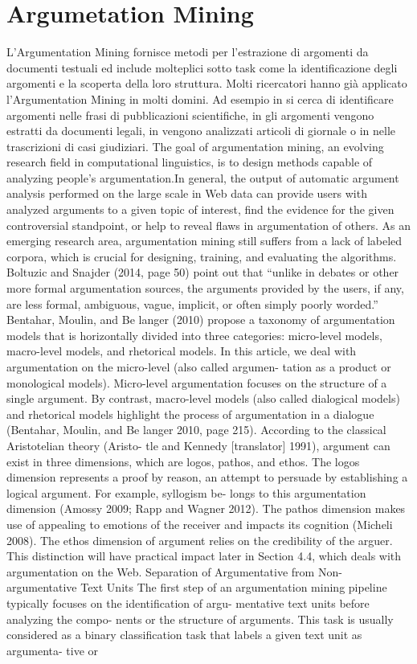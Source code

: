 \section{Argumetation Mining}
L'Argumentation Mining fornisce metodi per l'estrazione di argomenti da documenti testuali ed include molteplici sotto task come la identificazione degli argomenti e la scoperta della loro struttura. Molti ricercatori hanno già applicato l'Argumentation Mining in molti domini. Ad esempio in \cite{teufel1999annotation} si cerca di identificare argomenti nelle frasi di pubblicazioni scientifiche, in \cite{moens2007automatic} gli argomenti vengono estratti da documenti legali, in \cite{feng2011classifying} vengono analizzati articoli di giornale o in \cite{florou2013argument} nelle trascrizioni di casi giudiziari. The goal of argumentation mining, an evolving research field in computational linguistics, is to design methods capable of analyzing people’s argumentation.In general, the output of automatic argument analysis performed on the large scale in Web data can provide users with analyzed arguments to a given topic of interest, find the evidence for the given controversial standpoint, or help to reveal flaws in argumentation of others. As an emerging research area, argumentation mining still suffers from a lack of labeled corpora, which is crucial for designing, training, and evaluating the algorithms. Boltuzic  and Snajder (2014, page 50) point out that “unlike in debates or other more formal argumentation sources, the arguments provided by the users, if any, are less formal, ambiguous, vague, implicit, or often simply poorly worded.” Bentahar, Moulin, and Be langer (2010) propose a taxonomy of argumentation models that is horizontally divided into three categories: micro-level models, macro-level models, and rhetorical models. In this article, we deal with argumentation on the micro-level (also called argumen- tation as a product or monological models). Micro-level argumentation focuses on the structure of a single argument. By contrast, macro-level models (also called dialogical models) and rhetorical models highlight the process of argumentation in a dialogue (Bentahar, Moulin, and Be langer 2010, page 215). According to the classical Aristotelian theory (Aristo- tle and Kennedy [translator] 1991), argument can exist in three dimensions, which are logos, pathos, and ethos. The logos dimension represents a proof by reason, an attempt to persuade by establishing a logical argument. For example, syllogism be- longs to this argumentation dimension (Amossy 2009; Rapp and Wagner 2012). The pathos dimension makes use of appealing to emotions of the receiver and impacts its cognition (Micheli 2008). The ethos dimension of argument relies on the credibility of the arguer. This distinction will have practical impact later in Section 4.4, which deals with argumentation on the Web. Separation of Argumentative from Non-argumentative Text Units The first step of an argumentation mining pipeline typically focuses on the identification of argu- mentative text units before analyzing the compo- nents or the structure of arguments. This task is usually considered as a binary classification task that labels a given text unit as argumenta- tive or 